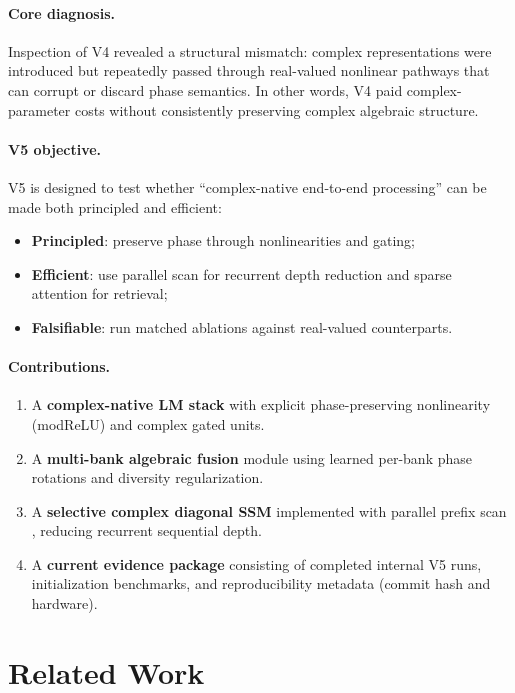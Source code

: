 \documentclass[11pt]{article}
\begin{document}
\paragraph{Core diagnosis.}
Inspection of V4 revealed a structural mismatch: complex representations were introduced but repeatedly passed through real-valued nonlinear pathways that can corrupt or discard phase semantics.
In other words, V4 paid complex-parameter costs without consistently preserving complex algebraic structure.

\paragraph{V5 objective.}
V5 is designed to test whether ``complex-native end-to-end processing'' can be made both principled and efficient:
\begin{itemize}[leftmargin=1.2em]
  \item \textbf{Principled}: preserve phase through nonlinearities and gating;
  \item \textbf{Efficient}: use parallel scan for recurrent depth reduction and sparse attention for retrieval;
  \item \textbf{Falsifiable}: run matched ablations against real-valued counterparts.
\end{itemize}

\paragraph{Contributions.}
\begin{enumerate}[leftmargin=1.2em]
  \item A \textbf{complex-native LM stack} with explicit phase-preserving nonlinearity (modReLU) and complex gated units.
  \item A \textbf{multi-bank algebraic fusion} module using learned per-bank phase rotations and diversity regularization.
  \item A \textbf{selective complex diagonal SSM} implemented with parallel prefix scan \citep{blelloch1990prefix}, reducing recurrent sequential depth.
  \item A \textbf{current evidence package} consisting of completed internal V5 runs, initialization benchmarks, and reproducibility metadata (commit hash and hardware).
\end{enumerate}

\section{Related Work}
\end{document}
